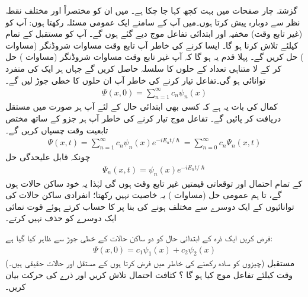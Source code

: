 گزشتہ چار صفحات میں بہت کچھ کہا جا چکا ہے۔ میں ان کو مختصراً اور مختلف نقطہ نظر سے دوبارہ پیش کرتا ہوں۔میں آپ کے سامنے ایک عمومی مسئلہ رکھتا ہوں: آپ کو (غیر تابع وقت) مخفیہ  اور ابتدائی تفاعل موج  دیے گئے ہوں گے۔ آپ کو مستقبل کے تمام  کیلئے  تلاش کرنا ہو گا۔ ایسا کرنے کی خاطر آپ تابع وقت مساوات شروڈنگر (مساوات ) حل کریں گے۔ پہلا قدم یہ ہو گا کہ آپ غیر تابع وقت مساوات شروڈنگر (مساوات ) حل کر کے لا متناہی تعداد کے حلوں کا سلسلہ  حاصل کریں گے جہاں ہر ایک
 کی منفرد توانائی  ہو گی۔تفاعل تیار کرنے کی خاطر آپ ان حلوں کا خطی جوڑ لیں گے۔
\begin{align}\label{مساوات_شروڈنگر_ساکن_حالات_کا_خطی_جوڑ}
\Psi (x,0) = \sum_{n=1}^{\infty} c_{n} \psi_{n}(x)
\end{align}
کمال کی بات یہ ہے کہ کسی بھی ابتدائی حال کے لئے آپ ہر صورت میں مستقل  دریافت کر پائیں گے۔ تفاعل موج  تیار کرنے کی خاطر آپ ہر جزو کے ساتھ مختص تابعیت وقت  چسپاں کریں گے۔ 
\begin{align}\label{مساوات_شروڈنگر_عمومی_حل_مجموعہ}
\Psi (x,t) = \sum_{n=1}^{\infty} c_{n} \psi_{n}(x)e^{-iE_{n}t/\hslash} = \sum_{n=0}^{\infty} c_{n} \Psi_{n} (x,t)
\end{align}
چونکہ قابل علیحدگی حل
\begin{align}\label{مساوات_شروڈنگر_تمام_عمومی_حل}
\Psi_{n} (x,t) = \psi_{n}(x) e^{-iE_{n}t/\hslash}
\end{align}
کے تمام احتمال اور توقعاتی قیمتیں غیر تابع وقت ہوں گی لہٰذا یہ خود ساکن حالات ہوں گے، تا ہم عمومی حل (مساوات ) یہ خاصیت نہیں رکھتا؛ انفرادی ساکن حالات کی توانائیوں کے ایک دوسرے سے مختلف ہونے کی بنا پر  کا حساب کرتے ہوئے قوت نمائی ایک دوسرے کو حذف نہیں کرتے۔ 


فرض کریں ایک ذرہ کے ابتدائی حال کو دو ساکن حالات کے خطی جوڑ سے ظاہر کیا گیا ہے: 
\begin{align*}
\Psi (x,0) = c_{1} \psi_{1}(x) + c_{2} \psi_{2}(x) 
\end{align*}
(چیزوں کو سادہ رکھنے کی خاطر میں فرض کرتا ہوں کے مستقل  اور حالات  حقیقی ہیں۔) مستقبل وقت  کیلئے تفاعل موج  کیا ہو گا ؟ کثافت احتمال تلاش کریں اور ذرے کی حرکت بیان کریں۔ 

